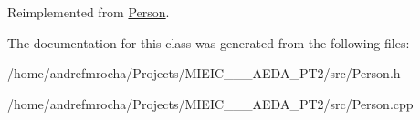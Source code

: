 Reimplemented from \mbox{\hyperlink{class_person_a80f87df3f644706c2ad8fc8b800fdd95}{Person}}.



The documentation for this class was generated from the following files\+:\begin{DoxyCompactItemize}
\item 
/home/andrefmrocha/\+Projects/\+M\+I\+E\+I\+C\+\_\+\_\+\_\+\+A\+E\+D\+A\+\_\+\+P\+T2/src/Person.\+h\item 
/home/andrefmrocha/\+Projects/\+M\+I\+E\+I\+C\+\_\+\_\+\_\+\+A\+E\+D\+A\+\_\+\+P\+T2/src/Person.\+cpp\end{DoxyCompactItemize}
